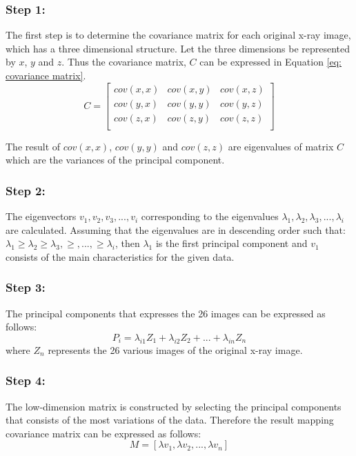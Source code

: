 \documentclass[11pt,twocolumn]{witseiepaper}
\begin{document}
	\subsubsection{Step 1:} The first step is to determine the covariance matrix for each original x-ray image, which has a three dimensional structure. Let the three dimensions be represented by $x$, $y$ and $z$. Thus the covariance matrix, $C$ can be expressed in Equation \ref{eq: covariance matrix}.
	\begin{equation}
		\label{eq: covariance matrix}
		C = 
		\begin{bmatrix}
			cov(x,x) & cov(x,y) & cov(x,z) \\
			cov(y,x) & cov(y,y) & cov(y,z) \\
			cov(z,x) & cov(z,y) & cov(z,z) \\
		\end{bmatrix}
	\end{equation}
	
	The result of $cov(x,x)$, $cov(y,y)$ and $cov(z,z)$ are eigenvalues of matrix $C$ which are the variances of the principal component.
	
	\subsubsection{Step 2:} The eigenvectors $v_1, v_2, v_3, ... , v_i$ corresponding to the eigenvalues $\lambda_1, \lambda_2, \lambda_3, ... , \lambda_i$ are calculated. Assuming that the eigenvalues are in descending order such that: $\lambda_1 \geq \lambda_2 \geq \lambda_3, \geq, ...,\geq \lambda_i$, then $\lambda_1$ is the first principal component and $v_1$ consists of the main characteristics for the given data.
	
	\subsubsection{Step 3:} The principal components that expresses the 26 images can be expressed as follows:
	\begin{equation}
		P_i = \lambda_{i1}Z_1 + \lambda_{i2}Z_2 + ... + \lambda_{in}Z_n
	\end{equation} 
	where $Z_n$ represents the 26 various images of the original x-ray image. 
	
	\subsubsection{Step 4:}
	The low-dimension matrix is constructed by selecting the principal components that consists of the most variations of the data. Therefore the result mapping covariance matrix can be expressed as follows: 
	\begin{equation}
		M = [\lambda v_1, \lambda v_2, ... , \lambda v_n]
	\end{equation} 
	
\end{document}
